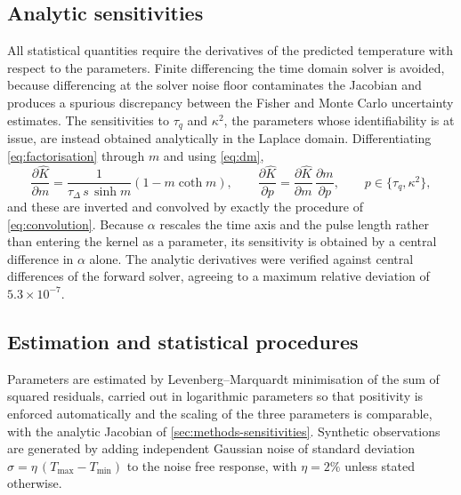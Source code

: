 \documentclass[preprint,12pt,a4paper]{elsarticle}
\theoremstyle{plain}
\theoremstyle{definition}
\theoremstyle{remark}
\newcommand{\tq}{\tau_{q}}
\newcommand{\kk}{\kappa^{2}}
\begin{document}
\subsection{Analytic sensitivities}
\label{sec:methods-sens}

All statistical quantities require the derivatives of the predicted temperature
with respect to the parameters. Finite differencing the time domain solver is
avoided, because differencing at the solver noise floor contaminates the
Jacobian and produces a spurious discrepancy between the Fisher and Monte Carlo
uncertainty estimates. The
sensitivities to $\tq$ and $\kk$, the parameters whose identifiability is at
issue, are instead obtained analytically in the Laplace domain. Differentiating
\eqref{eq:factorisation} through $m$ and using \eqref{eq:dm},
%
\begin{equation}
  \frac{\partial \hat{K}}{\partial m}
  = \frac{1}{\tau_{\Delta}\,s\,\sinh m}\left(1 - m \coth m\right),
  \qquad
  \frac{\partial \hat{K}}{\partial p}
  = \frac{\partial \hat{K}}{\partial m}\,\frac{\partial m}{\partial p},
  \qquad p \in \{\tq, \kk\} ,
  \label{eq:sens}
\end{equation}
%
and these are inverted and convolved by exactly the procedure of
\eqref{eq:convolution}. Because $\alpha$ rescales the time axis and the pulse
length rather than entering the kernel as a parameter, its sensitivity is
obtained by a central difference in $\alpha$ alone. The analytic derivatives
were verified against central differences of the forward solver, agreeing to a
maximum relative deviation of $5.3\times10^{-7}$.

\subsection{Estimation and statistical procedures}
\label{sec:methods-stats}

Parameters are estimated by Levenberg--Marquardt minimisation of the sum of
squared residuals, carried out in logarithmic parameters so that positivity is
enforced automatically and the scaling of the three parameters is comparable,
with the analytic Jacobian of \cref{sec:methods-sensitivities}. Synthetic observations
are generated by adding independent Gaussian noise of standard deviation
$\sigma = \eta\,(T_{\max}-T_{\min})$ to the noise free response, with
$\eta = 2\%$ unless stated otherwise.
\end{document}
